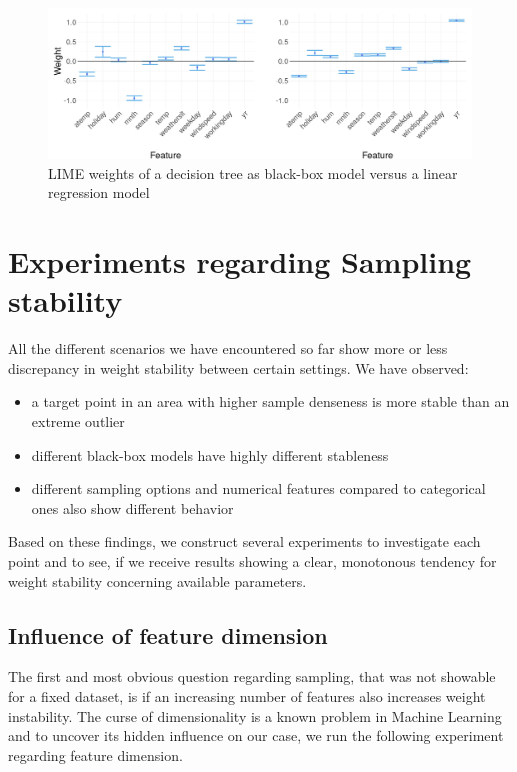 \documentclass[]{krantz}
\begin{document}
\begin{figure}

{\centering \includegraphics[width=0.99\linewidth]{images/bikes_treeVSlm} 

}

\caption{LIME weights of a decision tree as black-box model versus a linear regression model}\label{fig:figbiketreelm}
\end{figure}

\section{Experiments regarding Sampling
stability}\label{experiments-regarding-sampling-stability}

All the different scenarios we have encountered so far show more or less
discrepancy in weight stability between certain settings. We have
observed:

\begin{itemize}
\item
  a target point in an area with higher sample denseness is more stable
  than an extreme outlier
\item
  different black-box models have highly different stableness
\item
  different sampling options and numerical features compared to
  categorical ones also show different behavior
\end{itemize}

Based on these findings, we construct several experiments to investigate
each point and to see, if we receive results showing a clear, monotonous
tendency for weight stability concerning available parameters.

\subsection{Influence of feature
dimension}\label{influence-of-feature-dimension}

The first and most obvious question regarding sampling, that was not
showable for a fixed dataset, is if an increasing number of features
also increases weight instability. The curse of dimensionality is a
known problem in Machine Learning and to uncover its hidden influence on
our case, we run the following experiment regarding feature dimension.
\end{document}
